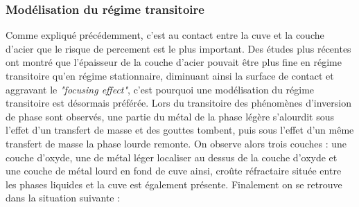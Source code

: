 \subsubsection{Modélisation du régime transitoire}
Comme expliqué précédemment, c'est au contact entre la cuve et la couche d'acier que le risque de percement est le plus important. Des études plus récentes ont montré que l'épaisseur de la couche d'acier pouvait être plus fine en régime transitoire qu'en régime stationnaire, diminuant ainsi la surface de contact et aggravant le \textit{"focusing effect"}, c'est pourquoi une modélisation du régime transitoire est désormais préférée. Lors du transitoire des phénomènes d'inversion de phase sont observés, une partie du métal de la phase légère s'alourdit sous l'effet d'un transfert de masse et des gouttes tombent, puis sous l'effet d'un même transfert de masse la phase lourde remonte. On observe alors trois couches : une couche d'oxyde, une de métal léger localiser au dessus de la couche d'oxyde et une couche de métal lourd en fond de cuve ainsi, croûte réfractaire située entre les phases liquides et la cuve est également présente. Finalement on se retrouve dans la situation suivante :
